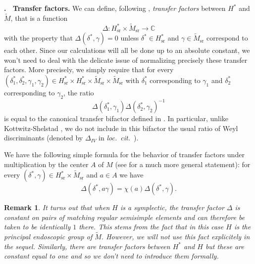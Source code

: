 \documentclass[12pt]{article}
\newenvironment{paragr}[1][]{\refstepcounter{subsubsection} \noindent \textbf{\thesubsubsection . \ #1}}{\medskip}
\newtheorem{rem}{Remark}[section]
\numberwithin{equation}{section}
\def\tM{\widetilde{M}}
\DeclareMathOperator{\sr}{sr}
\begin{document}
	
	\begin{paragr}[Transfer factors.]
		We can define, following \cite{KottShel}, {\em transfer factors} between $H^*$ and $\tM$, that is a function
		$$\displaystyle \Delta: H^*_{\sr}\times \tM_{\sr}\to \mathbb{C}$$
		with the property that $\Delta(\delta^*,\gamma)=0$ unless $\delta^*\in H^*_{\sr}$ and $\gamma\in \tM_{\sr}$ correspond to each other. Since our calculations will all be done up to an absolute constant, we won't need to deal with the delicate issue of normalizing precisely these transfer factors. More precisely, we simply require that for every $(\delta^*_1,\delta^*_2,\gamma_1,\gamma_2)\in H^*_{\sr}\times H^*_{\sr} \times \tM_{\sr}\times \tM_{\sr}$ with $\delta^*_1$ corresponding to $\gamma_1$ and $\delta^*_2$ corresponding to $\gamma_2$, the ratio
		$$\displaystyle \Delta(\delta^*_1,\gamma_1)\Delta(\delta^*_2,\gamma_2)^{-1}$$
		is equal to the canonical transfer bifactor defined in  \cite[Chap. I, Sect. 2.2]{MWStab1}. In particular, unlike Kottwitz-Shelstad \cite{KottShel}, we do not include in this bifactor the usual ratio of Weyl discriminants (denoted by $\Delta_{IV}$ in {\em loc.\ cit.}\ ).
		
		We have the following simple formula for the behavior of transfer factors under multiplication by the center $A$ of $M$ (see \cite[lemme I.2.7]{MWStab1} for a much more general statement): for every $(\delta^*,\gamma)\in H^*_{\sr}\times \tM_{\sr}$ and $a\in A$ we have
		\begin{equation}\label{central character transfer factors}
			\Delta(\delta^*,a\gamma)=\chi(a)\Delta(\delta^*,\gamma).
		\end{equation}
		
		\begin{rem}
			It turns out that when $H$ is a symplectic, the transfer factor $\Delta$ is constant on pairs of matching regular semisimple elements and can therefore be taken to be identically $1$ there. This stems from the fact that in this case $H$ is the {\em principal endoscopic group} of $\tM$. However, we will not use this fact explicitely in the sequel.
			Similarly, there are transfer factors between $H^*$ and $H$ but these are constant equal to one and so we don't need to introduce them formally.
		\end{rem}
	\end{paragr} 
	
\end{document}
